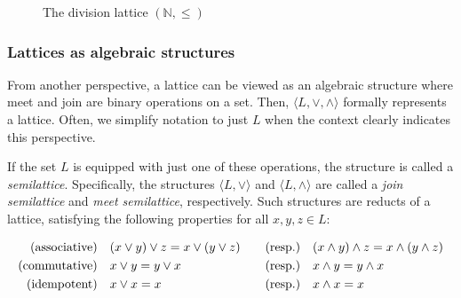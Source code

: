 \begin{example}
\begin{figure}[H]
  \caption{The division lattice $(\mathbb{N}, \leq)$}
  \label{figure:complete-lattice}
\end{figure}


\end{example}

\subsubsection{Lattices as algebraic structures}
\label{subsubsection:lattices-as-algebraic-structures}

From another perspective, a lattice can be viewed as an algebraic structure where meet and join are binary operations on a set. Then, $\langle L, \vee, \wedge \rangle$ formally represents a lattice. Often, we simplify notation to just $L$ when the context clearly indicates this perspective. 

If the set $L$ is equipped with just one of these operations, the structure is called a \textit{semilattice}. Specifically, the structures $\langle L, \vee \rangle$ and $\langle L, \wedge \rangle$ are called a \textit{join semilattice} and \textit{meet semilattice}, respectively. Such structures are reducts of a lattice, satisfying the following properties for all $x, y, z \in L$:

\vspace{-1em}
\begin{align}
     \text{(associative)} & \quad (x \vee y) \vee z = x \vee (y \vee z) & \quad \text{(resp.)} & \quad (x \wedge y) \wedge z = x \wedge (y \wedge z) \\ \index{Boolean operator! associativity} 
  \text{(commutative)} & \quad x \vee y = y \vee x & \text{(resp.)}  & \quad x \wedge y = y \wedge x \\ \index{Boolean operator! commutativity}
  \text{(idempotent)}  & \quad x \vee x = x & \text{(resp.)}  & \quad x \wedge x = x \index{Boolean operator! idempotency}
\end{align}


